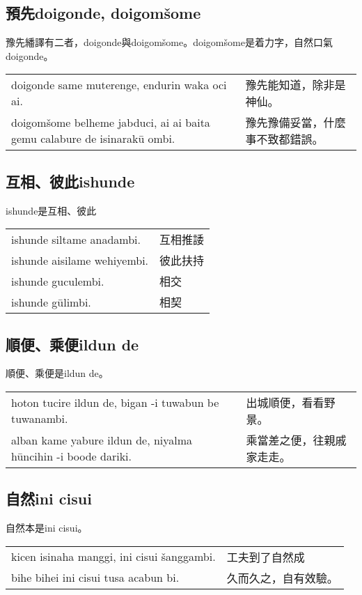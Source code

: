 \documentclass{article}
\begin{document}
\subsection{預先doigonde, doigom\v{s}ome}
\noindent 豫先繙譯有二者，doigonde與doigom\v{s}ome。doigom\v{s}ome是着力字，自然口氣doigonde。
\begin{center}
    \begin{tabularx}{\textwidth}{XX}
        doigonde same muterenge, endurin waka oci ai. & 豫先能知道，除非是神仙。\\
        doigom\v{s}ome belheme jabduci, ai ai baita gemu calabure de isinarak\={u} ombi. & 豫先豫備妥當，什麼事不致都錯誤。
    \end{tabularx}
\end{center}

\subsection{互相、彼此ishunde}
\noindent ishunde是互相、彼此
\begin{center}
    \begin{tabularx}{\textwidth}{XX}
        ishunde siltame anadambi. & 互相推諉\\
        ishunde aisilame wehiyembi. & 彼此扶持\\
        ishunde guculembi. & 相交\\
        ishunde g\={u}limbi. & 相契
    \end{tabularx}
\end{center}

\subsection{順便、乘便ildun de}
\noindent 順便、乘便是ildun de。
\begin{center}
    \begin{tabularx}{\textwidth}{XX}
        hoton tucire ildun de, bigan -i tuwabun be tuwanambi. & 出城順便，看看野景。\\
        alban kame yabure ildun de, niyalma h\={u}ncihin -i boode dariki. & 乘當差之便，往親戚家走走。
    \end{tabularx}
\end{center}

\subsection{自然ini cisui}
\noindent 自然本是ini cisui。
\begin{center}
    \begin{tabularx}{\textwidth}{XX}
        kicen isinaha manggi, ini cisui \v{s}anggambi. & 工夫到了自然成\\
        bihe bihei ini cisui tusa acabun bi. & 久而久之，自有效驗。
    \end{tabularx}
\end{center}
\end{document}
